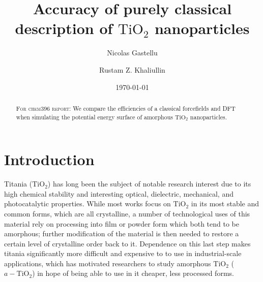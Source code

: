 \documentclass[aps,prb,twocolumn,amsmath,amssymb,superscriptaddress,longbibliography]{revtex4-1}
\newcommand\tab[1][1cm]{\hspace*{#1}} %
\begin{document}
\title{
Accuracy of purely classical description of $\text{TiO}_2$ nanoparticles
}

\author{Nicolas Gastellu}
\author{Rustam Z. Khaliullin}

\date{\today}

\begin{abstract}

\textsc{For chem396 report:} We compare the efficiencies of a classical forcefields and DFT when simulating the potential energy surface of amorphous $\text{TiO}_2$ nanoparticles.

\end{abstract}

\maketitle
 

\section*{Introduction} 

\tab Titania ($\text{TiO}_2$) has long been the subject of notable research interest due to its high chemical stability and interesting optical, dielectric, mechanical, and photocatalytic properties\cite{optical,thin-film,mechanical,photocatalytic}. 
While most works focus on $\text{TiO}_2$ in its most stable and common forms, which are all crystalline, a number of technological uses of this material rely on processing into film or powder form which both tend to be amorphous; further modification of the material is then needed to restore a certain level of crystalline order back to it\cite{a2c,ab_initio}.
Dependence on this last step makes titania significantly more difficult and expensive to to use in industrial-scale applications, which has motivated researchers to study amorphous $\text{TiO}_2$ ($a-\text{TiO}_2$) in hope of being able to use in it cheaper, less processed forms\cite{useful1,useful2,useful3}. 
\end{document}
